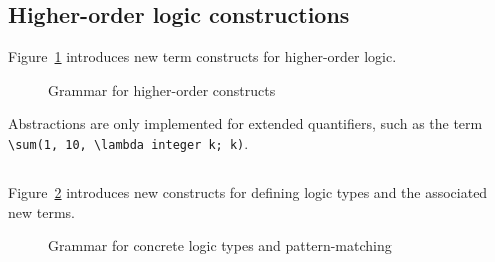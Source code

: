 
\subsection{Higher-order logic constructions}
\label{sec:higherorder}

\experimental

\nodiff

Figure~\ref{fig:gram:higherorder} introduces new term constructs for
higher-order logic.

\begin{figure}[htp]
  \begin{cadre}
      
    \end{cadre}
  \caption{Grammar for higher-order constructs}
\label{fig:gram:higherorder}
\end{figure}

{\highlightnotimplemented Abstractions are only implemented for extended
  quantifiers, such as the term \lstinline|\sum(1, 10, \lambda integer k; k)|.}


\subsection{}
\label{sec:concrete-logic-types}
\experimental

\nodiff

Figure~\ref{fig:gram:logictype} introduces new constructs for defining logic
types and the associated new terms.

\begin{figure}[htp]
  \begin{cadre}
      
    \end{cadre}
  \caption{Grammar for concrete logic types and pattern-matching}
\label{fig:gram:logictype}
\end{figure}


\subsection{}
\label{sec:logicalstates}
\nodiff

